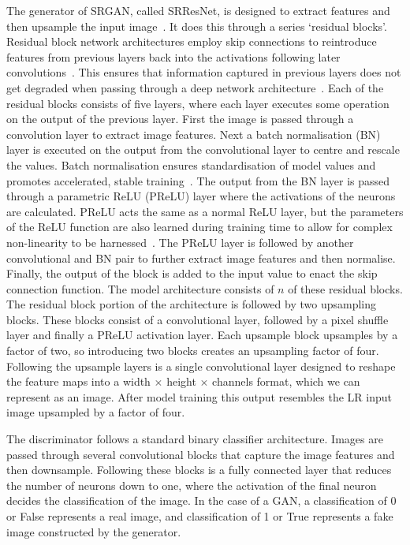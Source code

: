 The generator of SRGAN, called SRResNet, is designed to extract features and then upsample the input image~\cite{srgan}. It does this through a series `residual blocks'. Residual block network architectures employ skip connections to reintroduce features from previous layers back into the activations following later convolutions~\cite{residualNets}. This ensures that information captured in previous layers does not get degraded when passing through a deep network architecture~\cite{residualNets}. Each of the residual blocks consists of five layers, where each layer executes some operation on the output of the previous layer. First the image is passed through a convolution layer to extract image features. Next a batch normalisation (BN) layer is executed on the output from the convolutional layer to centre and rescale the values. Batch normalisation ensures standardisation of model values and promotes accelerated, stable training~\cite{batchNorm}. The output from the BN layer is passed through a parametric ReLU (PReLU) layer where the activations of the neurons are calculated. PReLU acts the same as a normal ReLU layer, but the parameters of the ReLU function are also learned during training time to allow for complex non-linearity to be harnessed~\cite{prelu}. The PReLU layer is followed by another convolutional and BN pair to further extract image features and then normalise. Finally, the output of the block is added to the input value to enact the skip connection function. The model architecture consists of $n$ of these residual blocks. The residual block portion of the architecture is followed by two upsampling blocks. These blocks consist of a convolutional layer, followed by a pixel shuffle layer and finally a PReLU activation layer. Each upsample block upsamples by a factor of two, so introducing two blocks creates an upsampling factor of four. Following the upsample layers is a single convolutional layer designed to reshape the feature maps into a width $\times$ height $\times$ channels format, which we can represent as an image. After model training this output resembles the LR input image upsampled by a factor of four.

The discriminator follows a standard binary classifier architecture. Images are passed through several convolutional blocks that capture the image features and then downsample. Following these blocks is a fully connected layer that reduces the number of neurons down to one, where the activation of the final neuron decides the classification of the image. In the case of a GAN, a classification of 0 or False represents a real image, and classification of 1 or True represents a fake image constructed by the generator. 

